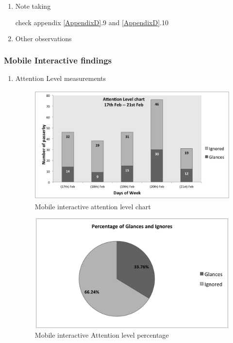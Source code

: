 \begin{enumerate}
\begin{enumerate}
\end{enumerate}

\item Note taking


check appendix \ref{AppendixD}.9 and \ref{AppendixD}.10


\item Other observations
\end{enumerate}

\subsubsection{Mobile Interactive findings}


\begin{enumerate}
\item Attention Level measurements

\begin{figure}[H]
    \centering
    \includegraphics[width=110mm,height=60mm]{Figures/8/mobile_inter_findings/mobile_Inter_chart}%
    \caption{Mobile interactive attention level chart}%
    \label{fig:mobileattentionlevelchart}%
\end{figure}


\begin{figure}[H]
    \centering
    \includegraphics[width=110mm,height=60mm]{Figures/8/mobile_inter_findings/mobile_inter_percentage}
    \caption{Mobile interactive Attention level percentage}%
    \label{fig:bodyattentionlevelpercentage}%
\end{figure}



\end{enumerate}
